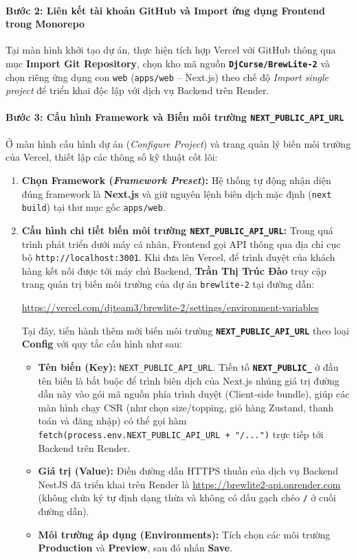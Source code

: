 \paragraph{Bước 2: Liên kết tài khoản GitHub và Import ứng dụng Frontend trong Monorepo}
Tại màn hình khởi tạo dự án, thực hiện tích hợp Vercel với GitHub thông qua mục \textbf{Import Git Repository}, chọn kho mã nguồn \textbf{\texttt{DjCurse/BrewLite-2}} và chọn riêng ứng dụng con \texttt{web} (\texttt{apps/web} -- Next.js) theo chế độ \textit{Import single project} để triển khai độc lập với dịch vụ Backend trên Render.

\paragraph{Bước 3: Cấu hình Framework và Biến môi trường \texttt{NEXT\_PUBLIC\_API\_URL}}
Ở màn hình cấu hình dự án (\textit{Configure Project}) và trang quản lý biến môi trường của Vercel, thiết lập các thông số kỹ thuật cốt lõi:
\begin{enumerate}
    \item \textbf{Chọn Framework (\textit{Framework Preset}):} Hệ thống tự động nhận diện đúng framework là \textbf{Next.js} và giữ nguyên lệnh biên dịch mặc định (\texttt{next build}) tại thư mục gốc \texttt{apps/web}.
    \item \textbf{Cấu hình chi tiết biến môi trường \texttt{NEXT\_PUBLIC\_API\_URL}:}
    Trong quá trình phát triển dưới máy cá nhân, Frontend gọi API thông qua địa chỉ cục bộ \texttt{http://localhost:3001}. Khi đưa lên Vercel, để trình duyệt của khách hàng kết nối được tới máy chủ Backend, \textbf{Trần Thị Trúc Đào} truy cập trang quản trị biến môi trường của dự án \texttt{brewlite-2} tại đường dẫn:
    \begin{center}
    \url{https://vercel.com/djteam3/brewlite-2/settings/environment-variables}
    \end{center}
    Tại đây, tiến hành thêm mới biến môi trường \textbf{\texttt{NEXT\_PUBLIC\_API\_URL}} theo loại \textbf{Config} với quy tắc cấu hình như sau:
    \begin{itemize}
        \item \textbf{Tên biến (Key):} \texttt{NEXT\_PUBLIC\_API\_URL}. Tiền tố \textbf{\texttt{NEXT\_PUBLIC\_}} ở đầu tên biến là bắt buộc để trình biên dịch của Next.js nhúng giá trị đường dẫn này vào gói mã nguồn phía trình duyệt (Client-side bundle), giúp các màn hình chạy CSR (như chọn size/topping, giỏ hàng Zustand, thanh toán và đăng nhập) có thể gọi hàm \texttt{fetch(process.env.NEXT\_PUBLIC\_API\_URL + "/...")} trực tiếp tới Backend trên Render.
        \item \textbf{Giá trị (Value):} Điền đường dẫn HTTPS thuần của dịch vụ Backend NestJS đã triển khai trên Render là \url{https://brewlite2-api.onrender.com} (không chứa ký tự định dạng thừa và không có dấu gạch chéo \texttt{/} ở cuối đường dẫn).
        \item \textbf{Môi trường áp dụng (Environments):} Tích chọn các môi trường \textbf{Production} và \textbf{Preview}, sau đó nhấn \textbf{Save}.
    \end{itemize}
\end{enumerate}

